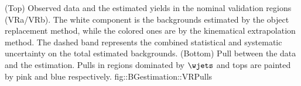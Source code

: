 {(Top) Observed data and the estimated yields in the nominal validation regions (VRa/VRb). 
The white component is the backgrounds estimated by the object replacement method, while the colored ones are by the kinematical extrapolation method. The dashed band represents the combined statistical and systematic uncertainty on the total estimated backgrounds. (Bottom) Pull between the data and the estimation. Pulls in regions dominated by $\wjets$ and tops are painted by pink and blue respectively.}
{fig::BGestimation::VRPulls}



